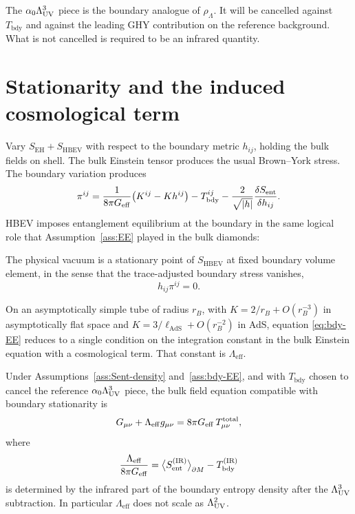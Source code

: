 The \(\alpha_0\Lambda_{\mathrm{UV}}^3\) piece is the boundary analogue of
\(\rho_\Lambda\). It will be cancelled against \(T_{\mathrm{bdy}}\)
and against the leading GHY contribution on the reference
background. What is not cancelled is required to be an infrared
quantity.

\section{Stationarity and the induced cosmological term}
\label{sec:ch12-stationarity}

Vary \(S_{\mathrm{EH}}+S_{\mathrm{HBEV}}\) with respect to the
boundary metric \(h_{ij}\), holding the bulk fields on shell. The
bulk Einstein tensor produces the usual Brown--York stress. The
boundary variation produces
\begin{equation}
  \label{eq:BY}
  \pi^{ij}
  =\frac{1}{8\pi G_{\mathrm{eff}}}
   \bigl(K^{ij}-Kh^{ij}\bigr)
   -T_{\mathrm{bdy}}^{ij}
   -\frac{2}{\sqrt{|h|}}
    \frac{\delta S_{\mathrm{ent}}}{\delta h_{ij}}.
\end{equation}
HBEV imposes entanglement equilibrium at the boundary in the same
logical role that Assumption~\ref{ass:EE} played in the bulk
diamonds:

\begin{assumption}
  \label{ass:bdy-EE}
  The physical vacuum is a stationary point of \(S_{\mathrm{HBEV}}\)
  at fixed boundary volume element, in the sense that the
  trace-adjusted boundary stress vanishes,
  \begin{equation}
    \label{eq:bdy-EE}
    h_{ij}\pi^{ij}=0.
  \end{equation}
\end{assumption}

On an asymptotically simple tube of radius \(r_B\), with
\(K=2/r_B+O(r_B^{-3})\) in asymptotically flat space and
\(K=3/\ell_{\mathrm{AdS}}+O(r_B^{-2})\) in AdS, equation
\eqref{eq:bdy-EE} reduces to a single condition on the integration
constant in the bulk Einstein equation with a cosmological term.
That constant is \(\Lambda_{\mathrm{eff}}\).

\begin{theorem}
  \label{thm:Leff}
  Under Assumptions~\ref{ass:Sent-density} and~\ref{ass:bdy-EE},
  and with \(T_{\mathrm{bdy}}\) chosen to cancel the reference
  \(\alpha_0\Lambda_{\mathrm{UV}}^3\) piece, the bulk field equation compatible
  with boundary stationarity is
  \begin{equation}
    \label{eq:EFE-Leff}
    G_{\mu\nu}+\Lambda_{\mathrm{eff}}g_{\mu\nu}
    =8\pi G_{\mathrm{eff}}\,T_{\mu\nu}^{\mathrm{total}},
  \end{equation}
  where
  \begin{equation}
    \label{eq:Leff}
    \frac{\Lambda_{\mathrm{eff}}}{8\pi G_{\mathrm{eff}}}
    =\bigl\langle
       S_{\mathrm{ent}}^{\mathrm{(IR)}}
     \bigr\rangle_{\partial M}
    -T_{\mathrm{bdy}}^{\mathrm{(IR)}}
  \end{equation}
  is determined by the infrared part of the boundary entropy
  density after the \(\Lambda_{\mathrm{UV}}^3\) subtraction. In particular
  \(\Lambda_{\mathrm{eff}}\) does not scale as \(\Lambda_{\mathrm{UV}}^2\).
\end{theorem}

